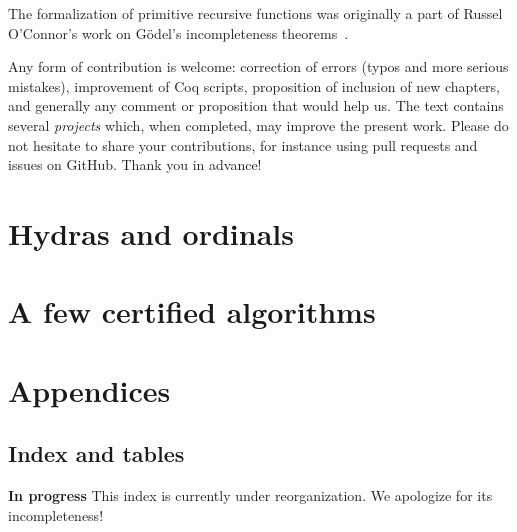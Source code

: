\documentclass[twoside,a4paper]{book}
\begin{document}
The formalization of primitive recursive functions was originally a part of  Russel O'Connor's work on G\"odel's incompleteness theorems~\cite{OConnor05}. 

\label{sec:orgheadline2}

Any form of contribution  is welcome: correction of errors (typos and more serious mistakes), improvement of
Coq scripts, proposition of inclusion of new chapters, and generally any
comment or proposition that would help us. The text contains several \emph{projects} which, when completed, may improve the present work.
Please do not hesitate to share your contributions, for instance using pull requests and issues on GitHub. Thank you in advance!






\part{Hydras and ordinals}



\part{A few  certified algorithms}



\part{Appendices}








\chapter{Index and tables}

{\Large \textbf{In progress} This index is currently under reorganization.  We apologize for its incompleteness! }

\end{document}
